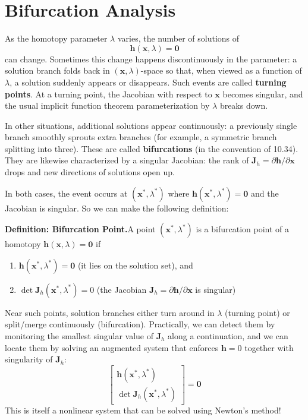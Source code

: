 \section{Bifurcation Analysis}
As the homotopy parameter $\lambda$ varies, the number of solutions of
\[
\mathbf{h}(\mathbf{x},\lambda)=\mathbf{0}
\]
can change. Sometimes this change happens discontinuously in the parameter: a solution branch folds back in $(\mathbf{x},\lambda)$-space so that, when viewed as a function of $\lambda$, a solution suddenly appears or disappears. Such events are called \textbf{turning points}. At a turning point, the Jacobian with respect to $\mathbf{x}$ becomes singular, and the usual implicit function theorem parameterization by $\lambda$ breaks down.

In other situations, additional solutions appear continuously: a previously single branch smoothly sprouts extra branches (for example, a symmetric branch splitting into three). These are called \textbf{bifurcations} (in the convention of 10.34). They are likewise characterized by a singular Jacobian: the rank of $\mathbf{J}_h=\partial \mathbf{h}/\partial \mathbf{x}$ drops and new directions of solutions open up.

In both cases, the event occurs at $(\mathbf{x}^*,\lambda^*)$ where $\mathbf{h}(\mathbf{x}^*,\lambda^*)=\mathbf{0}$ and the Jacobian is singular. So we can make the following definition:
\begin{definitionBox}
    \textbf{Definition: Bifurcation Point.}\quad A point $(\mathbf{x}^*,\lambda^*)$ is a bifurcation point of a homotopy $\mathbf{h}(\mathbf{x},\lambda)=\mathbf{0}$ if
    \begin{enumerate}
        \item $\mathbf{h}(\mathbf{x}^*,\lambda^*)=\mathbf{0}$ \quad (it lies on the solution set), and
        \item $\det \mathbf{J}_h(\mathbf{x}^*,\lambda^*)=0$ \quad (the Jacobian $\mathbf{J}_h=\partial \mathbf{h}/\partial \mathbf{x}$ is singular)
    \end{enumerate}
\end{definitionBox}
Near such points, solution branches either turn around in $\lambda$ (turning point) or split/merge continuously (bifurcation). Practically, we can detect them by monitoring the smallest singular value of $\mathbf{J}_h$ along a continuation, and we can locate them by solving an augmented system that enforces $\mathbf{h}=0$ together with singularity of $\mathbf{J}_h$:
\begin{equation}
    \begin{bmatrix}
    \mathbf{h}(\mathbf{x}^*,\lambda^*) \\
    \det \mathbf{J}_h(\mathbf{x}^*,\lambda^*)
    \end{bmatrix} = \mathbf{0}
\end{equation}
This is itself a nonlinear system that can be solved using Newton's method!

